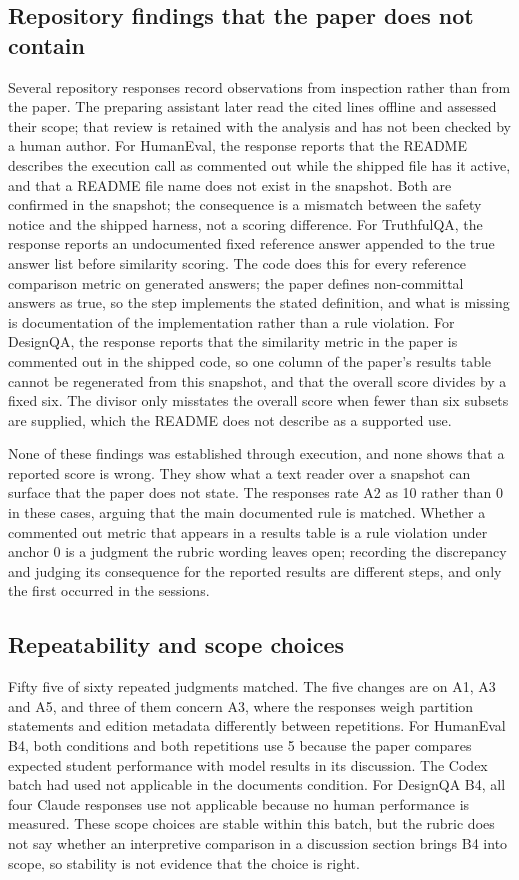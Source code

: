 \subsection{Repository findings that the paper does not contain}
Several repository responses record observations from inspection rather than from the paper. The preparing assistant later read the cited lines offline and assessed their scope; that review is retained with the analysis and has not been checked by a human author. For HumanEval, the response reports that the README describes the execution call as commented out while the shipped file has it active, and that a README file name does not exist in the snapshot. Both are confirmed in the snapshot; the consequence is a mismatch between the safety notice and the shipped harness, not a scoring difference. For TruthfulQA, the response reports an undocumented fixed reference answer appended to the true answer list before similarity scoring. The code does this for every reference comparison metric on generated answers; the paper defines non-committal answers as true, so the step implements the stated definition, and what is missing is documentation of the implementation rather than a rule violation. For DesignQA, the response reports that the similarity metric in the paper is commented out in the shipped code, so one column of the paper's results table cannot be regenerated from this snapshot, and that the overall score divides by a fixed six. The divisor only misstates the overall score when fewer than six subsets are supplied, which the README does not describe as a supported use.

None of these findings was established through execution, and none shows that a reported score is wrong. They show what a text reader over a snapshot can surface that the paper does not state. The responses rate A2 as 10 rather than 0 in these cases, arguing that the main documented rule is matched. Whether a commented out metric that appears in a results table is a rule violation under anchor 0 is a judgment the rubric wording leaves open; recording the discrepancy and judging its consequence for the reported results are different steps, and only the first occurred in the sessions.

\subsection{Repeatability and scope choices}
Fifty five of sixty repeated judgments matched. The five changes are on A1, A3 and A5, and three of them concern A3, where the responses weigh partition statements and edition metadata differently between repetitions. For HumanEval B4, both conditions and both repetitions use 5 because the paper compares expected student performance with model results in its discussion. The Codex batch had used not applicable in the documents condition. For DesignQA B4, all four Claude responses use not applicable because no human performance is measured. These scope choices are stable within this batch, but the rubric does not say whether an interpretive comparison in a discussion section brings B4 into scope, so stability is not evidence that the choice is right.

